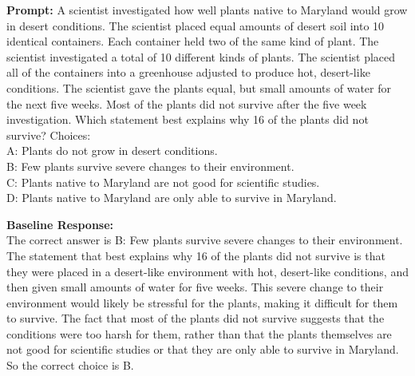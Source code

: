 \documentclass{article} %
\begin{document}
\begin{tcolorbox}[examplebox={Llama-3.2-1B-Instruct on ARC-c: both baseline and steering are correct}]
\textbf{Prompt:} A scientist investigated how well plants native to Maryland would grow in desert conditions. The scientist placed equal amounts of desert soil into 10 identical containers. Each container held two of the same kind of plant. The scientist investigated a total of 10 different kinds of plants. The scientist placed all of the containers into a greenhouse adjusted to produce hot, desert-like conditions. The scientist gave the plants equal, but small amounts of water for the next five weeks. Most of the plants did not survive after the five week investigation. Which statement best explains why 16 of the plants did not survive?
Choices:\\ \textcolor{incorrectcolor}{A: Plants do not grow in desert conditions.}\\ \textcolor{correctcolor}{B: Few plants survive severe changes to their environment.}\\ \textcolor{incorrectcolor}{C: Plants native to Maryland are not good for scientific studies.}\\ \textcolor{incorrectcolor}{D: Plants native to Maryland are only able to survive in Maryland.}

\vspace{0.5em}
\textbf{Baseline Response:}\\
The correct answer is B: Few plants survive severe changes to their environment.\\The statement that best explains why 16 of the plants did not survive is that they were placed in a desert-like environment with hot, desert-like conditions, and then given small amounts of water for five weeks. This severe change to their environment would likely be stressful for the plants, making it difficult for them to survive. The fact that most of the plants did not survive suggests that the conditions were too harsh for them, rather than that the plants themselves are not good for scientific studies or that they are only able to survive in Maryland. \textcolor{correctcolor}{So the correct choice is B.}


\end{tcolorbox}
\end{document}
